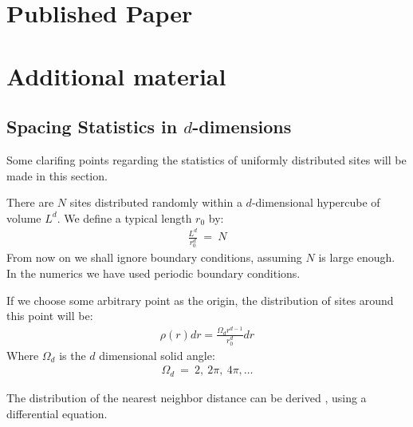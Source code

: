 \chapter{Published Paper}\label{sec:papers}


\chapter{Additional material}

\section{Spacing Statistics in $d$-dimensions}\label{sec:spacing}

Some clarifing points regarding the statistics of uniformly distributed sites 
will be made in this section.


There are $N$ sites distributed randomly within a $d$-dimensional
hypercube of volume $L^d$. We define a typical length $r_0$ by:
%
\begin{align}
\frac{L^d}{r_0^d} \ =\ N
\end{align}
%
From now on we shall ignore boundary conditions, assuming $N$ is large enough.
In the numerics we have used periodic boundary conditions.


If we choose some arbitrary point as the origin, the distribution of sites
around this point will be:
%
\begin{align}\label{eq:rho}
\rho(r)dr = \frac{\Omega_d r^{d-1}}{r_0^d}dr
\end{align}
% 
Where $\Omega_d$ is the $d$ dimensional solid angle:
%
\begin{align}
\Omega_d \ =\ 2,\ 2\pi,\ 4\pi, \ldots
\end{align}
%

The distribution of the nearest neighbor distance can be 
derived \cite{hertz_uber_1909,*Chandrasekhar_stochastic_1943,*Torquato_nearest-neighbor_1990},
using a differential equation. 


